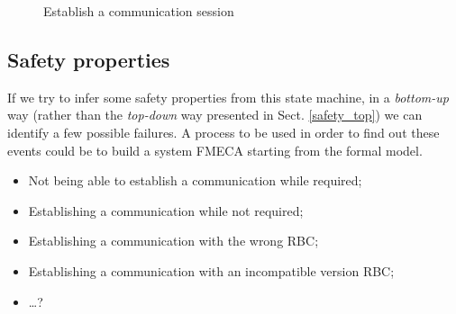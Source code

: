 \documentclass{template/openetcs_article}
\begin{document}
\begin{figure}
  \centering
  \caption{Establish a communication session}
  \label{fig:establish}
\end{figure}

\subsection{Safety properties}
If we try to infer some safety properties from this state machine, in a \emph{bottom-up} way 
(rather than the \emph{top-down} way presented in Sect. \ref{safety_top}) we can identify 
a few possible failures. A process to be used in order to find out these events could be
to build a system FMECA starting from the formal model.
\begin{itemize}
\item Not being able to establish a communication while required;
\item Establishing a communication while not required;
\item Establishing a communication with the wrong RBC;
\item Establishing a communication with an incompatible version RBC;
\item \dots ?
\end{itemize}
\end{document}

